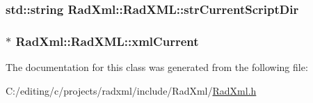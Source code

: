 \hypertarget{class_rad_xml_1_1_rad_x_m_l_a4fbdf937209a1d2fea48931facbecc0a}{
\subsubsection[{str\-Current\-Script\-Dir}]{\setlength{\rightskip}{0pt plus 5cm}std\-::string Rad\-Xml\-::\-Rad\-X\-M\-L\-::str\-Current\-Script\-Dir\hspace{0.3cm}{\ttfamily [protected]}}}\label{class_rad_xml_1_1_rad_x_m_l_a4fbdf937209a1d2fea48931facbecc0a}
\hypertarget{class_rad_xml_1_1_rad_x_m_l_a9bac803bf540c58c98901d56d2892ed2}{
\subsubsection[{xml\-Current}]{$\ast$ Rad\-Xml\-::\-Rad\-X\-M\-L\-::xml\-Current\hspace{0.3cm}{\ttfamily [protected]}}}\label{class_rad_xml_1_1_rad_x_m_l_a9bac803bf540c58c98901d56d2892ed2}


The documentation for this class was generated from the following file\-:\begin{DoxyCompactItemize}
\item 
C\-:/editing/c/projects/radxml/include/\-Rad\-Xml/\hyperlink{_rad_xml_8h}{Rad\-Xml.\-h}\end{DoxyCompactItemize}
